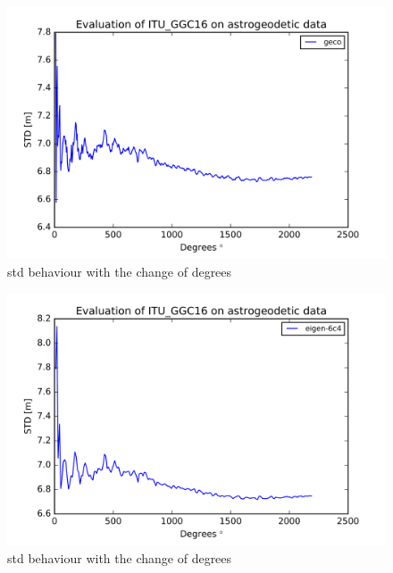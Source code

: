       
      \begin{figure}[t]
      	\caption{std behaviour with the change of degrees}
      	\label{geco_figure}
      	\includegraphics{Figures/geco_figure.png}
      	\centering
      \end{figure}
      
      \begin{figure}[t]
      	\caption{std behaviour with the change of degrees}
      	\label{eigen_6c4_figure}
      	\includegraphics{Figures/eigen-6c4_figure.png}
      	\centering
      \end{figure}
      
